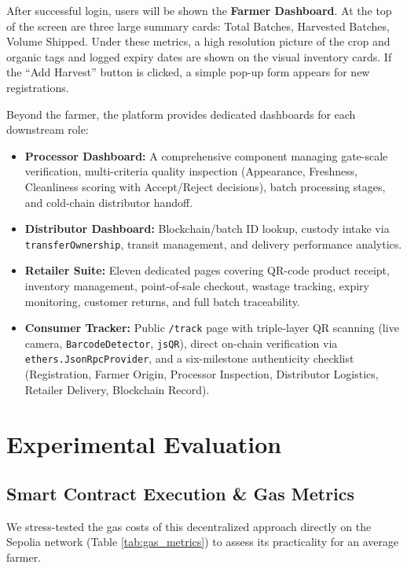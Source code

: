 \documentclass[conference]{IEEEtran}
\begin{document}
After successful login, users will be shown the \textbf{Farmer Dashboard}. At the top of the screen are three large summary cards: Total Batches, Harvested Batches, Volume Shipped. Under these metrics, a high resolution picture of the crop and organic tags and logged expiry dates are shown on the visual inventory cards. If the ``Add Harvest'' button is clicked, a simple pop-up form appears for new registrations.

Beyond the farmer, the platform provides dedicated dashboards for each downstream role:
\begin{itemize}
    \item \textbf{Processor Dashboard:} A comprehensive component managing gate-scale verification, multi-criteria quality inspection (Appearance, Freshness, Cleanliness scoring with Accept/Reject decisions), batch processing stages, and cold-chain distributor handoff.
    \item \textbf{Distributor Dashboard:} Blockchain/batch ID lookup, custody intake via \texttt{transferOwnership}, transit management, and delivery performance analytics.
    \item \textbf{Retailer Suite:} Eleven dedicated pages covering QR-code product receipt, inventory management, point-of-sale checkout, wastage tracking, expiry monitoring, customer returns, and full batch traceability.
    \item \textbf{Consumer Tracker:} Public \texttt{/track} page with triple-layer QR scanning (live camera, \texttt{BarcodeDetector}, \texttt{jsQR}), direct on-chain verification via \texttt{ethers.JsonRpcProvider}, and a six-milestone authenticity checklist (Registration, Farmer Origin, Processor Inspection, Distributor Logistics, Retailer Delivery, Blockchain Record).
\end{itemize}

\section{Experimental Evaluation}

\subsection{Smart Contract Execution \& Gas Metrics}
We stress-tested the gas costs of this decentralized approach directly on the Sepolia network (Table \ref{tab:gas_metrics}) to assess its practicality for an average farmer.
\end{document}
